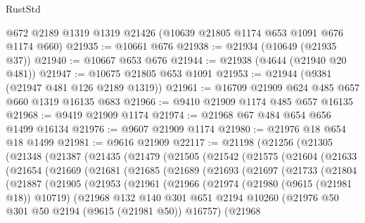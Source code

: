 \begin{lexlean}{RustStd}
\begin{coremodule}
    @672
    @2189
    @1319
    @1319
    @21426
    (@10639 @21805 @1174 @653 @1091 @676 @1174 @660)
@21935 := @10661 @676
@21938 := @21934 (@10649 (@21935 @37))
@21940 := @10667 @653 @676
@21944 := @21938 (@4644 (@21940 @20 @481))
@21947 := @10675 @21805 @653 @1091
@21953 := @21944 (@9381 (@21947 @481 @126 @2189 @1319))
@21961 := @16709 @21909 @624 @485 @657 @660 @1319 @16135 @683
@21966 := @9410 @21909 @1174 @485 @657 @16135
@21968 := @9419 @21909 @1174
@21974 := @21968 @67 @484 @654 @656 @1499 @16134
@21976 := @9607 @21909 @1174
@21980 := @21976 @18 @654 @18 @1499
@21981 := @9616 @21909
@22117 := @21198
    (@21256
      (@21305
        (@21348
          (@21387
            (@21435
              (@21479
                (@21505
                  (@21542
                    (@21575
                      (@21604
                        (@21633
                          (@21654
                            (@21669
                              (@21681
                                (@21685
                                  (@21689
                                    (@21693
                                      (@21697
                                        (@21733
                                          (@21804
                                            (@21887
                                              (@21905
                                                (@21953
                                                  (@21961
                                                    (@21966
                                                      (@21974
                                                        (@21980 (@9615 (@21981 @18)) @10719)
                                                        (@21968
                                                          @132
                                                          @140
                                                          @301
                                                          @651
                                                          @2194
                                                          @10260
                                                          (@21976
                                                            @50
                                                            @301
                                                            @50
                                                            @2194
                                                            (@9615 (@21981 @50))
                                                            @16757)
                                                          (@21968

\end{coremodule}
\end{lexlean}
